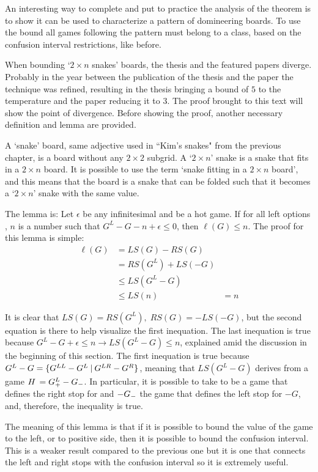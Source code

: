 An interesting way to complete and put to practice the analysis of the theorem is to show it can be used to characterize a pattern of domineering boards. To use the bound all games following the pattern must belong to a class, based on the confusion interval restrictions, like before.

When bounding `$2\times n$ snakes' boards, the thesis and the featured papers diverge. Probably in the year between the publication of the thesis and the paper the technique was refined, resulting in the thesis bringing a bound of $5$ to the temperature and the paper reducing it to $3$. The proof brought to this text will show the point of divergence. Before showing the proof, another necessary definition and lemma are provided.

A `snake' board, same adjective used in ``Kim's snakes" from the previous chapter, is a board without any $2\times 2$ subgrid. A `$2\times n$' snake is a snake that fits in a $2\times n$ board. It is possible to use the term `snake fitting in a $2\times n$ board', and this means that the board is a snake that can be folded such that it becomes a `$2\times n$' snake with the same value.

The lemma is: Let $\epsilon$ be any infinitesimal and \Gm{} be a hot game. If for all left options , $n$ is a number such that $G^L - G - n +\epsilon \leq 0$, then $\ell(G) \leq n$. The proof for this lemma is simple:
\begin{align*}
	\ell(G) &= LS(G) - RS(G) \\
	&= RS(G^L) + LS(-G) \\
	&\leq LS(G^L - G) \\
	&\leq LS(n)
	&= n
\end{align*}

It is clear that $LS(G) = RS(G^L),\; RS(G) = - LS(-G)$, but the second equation is there to help visualize the first inequation. The last inequation is true because $G^L - G + \epsilon \leq n \longrightarrow LS(G^L-G)\leq n$, explained amid the discussion in the beginning of this section. The first inequation is true because $G^L - G = \mbox{$\{G^{LL}-G^L\:|\:G^{LR}-G^R\}$}$, meaning that $LS(G^L-G)$ derives from a game $\mbox{$H\,$} = \mbox{$G^L_+$} - \mbox{$G_-$}$. In particular, it is possible to take  to be a game that defines the right stop for  and $-\mbox{$G_-$}$ the game that defines the left stop for $-G$, and, therefore, the inequality is true.

The meaning of this lemma is that if it is possible to bound the value of the game to the left, or to positive side, then it is possible to bound the confusion interval. This is a weaker result compared to the previous one but it is one that connects the left and right stops with the confusion interval so it is extremely useful.


